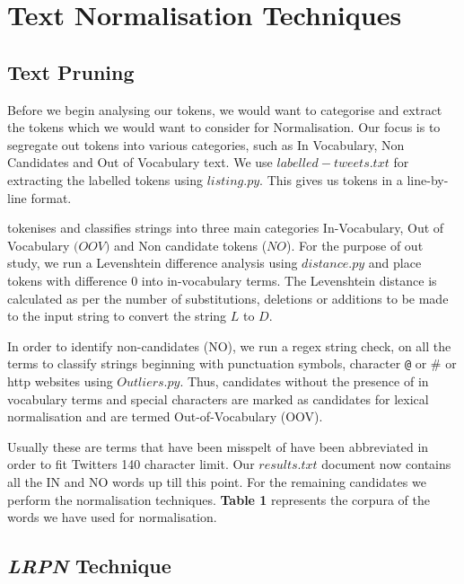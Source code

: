 \section{Text Normalisation Techniques}
\label{sec-background}

\subsection{Text Pruning}
Before we begin analysing our tokens, we would want to categorise and extract the tokens which we would want to consider for Normalisation. Our focus is to segregate out tokens into various categories, such as In Vocabulary, Non Candidates and Out of Vocabulary text. We use $labelled-tweets.txt$ for extracting the labelled tokens using $listing.py$. This gives us tokens in a line-by-line format. 


\texttt {\citet{lnt15b}} tokenises and classifies strings into three main categories In-Vocabulary, Out of Vocabulary $($$OOV$$)$ and Non candidate tokens ($NO$). For the purpose of out study, we run a Levenshtein difference analysis using $distance.py$ and place tokens with difference 0 into in-vocabulary terms. The Levenshtein distance is calculated as per the number of substitutions, deletions or additions to be made to the input string to convert the string ${L}$ to ${D}$. 

In order to identify non-candidates (NO), we run a regex string check, on all the terms to classify strings beginning with punctuation symbols, character {\nolinkurl{@}} or \# or http websites using $Outliers.py$. Thus, candidates without the presence of in vocabulary terms and special characters are marked as candidates for lexical normalisation and are termed Out-of-Vocabulary (OOV). 

Usually these are terms that have been misspelt of have been abbreviated in order to fit Twitters 140 character limit. Our $results.txt$ document now contains all the IN and NO words up till this point. For the remaining candidates we perform the normalisation techniques.  \textbf{Table 1} represents the corpura of the words we have used for normalisation. 

\subsection{{\itshape LRPN} Technique}
\begin{table}[t]
\centering

\aftertabspace
\end{table}
  
